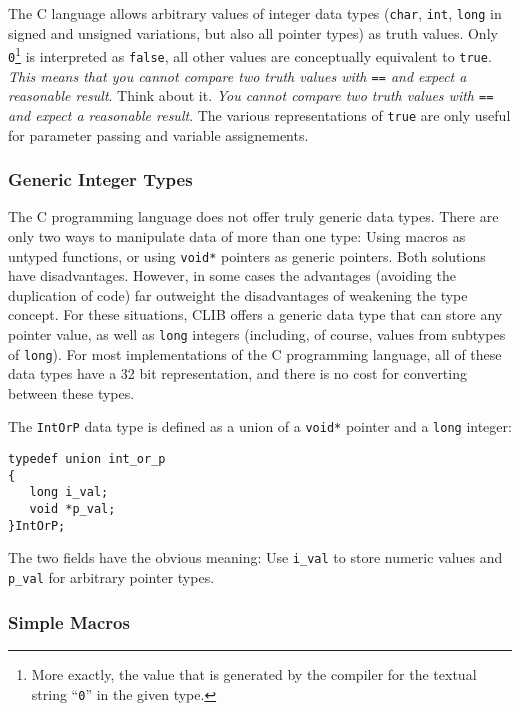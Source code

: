 The C language allows arbitrary values of integer data types
(\texttt{char}, \texttt{int}, \texttt{long} in signed and unsigned
variations, but also all pointer types) as truth values. Only
\texttt{0}\footnote{More exactly, the value that is generated by the
  compiler for the textual string ``\texttt{0}'' in the given type.}
is interpreted as \texttt{false}, all other values are conceptually
equivalent to \texttt{true}. \emph{This means that you cannot compare
  two truth values with \texttt{==} and expect a reasonable result}.
Think about it. \emph{You cannot compare two truth values with
  \texttt{==} and expect a reasonable result}. The various
representations of \texttt{true} are only useful for parameter passing
and variable assignements.


\subsubsection{Generic Integer Types}

The C programming language does not offer truly generic data types.
There are only two ways to manipulate data of more than one type:
Using macros as untyped functions, or using \texttt{void*} pointers as
generic pointers. Both solutions have disadvantages. However, in some
cases the advantages (avoiding the duplication of code) far outweight
the disadvantages of weakening the type concept. For these situations,
CLIB offers a generic data type that can store any pointer value, as
well as \texttt{long} integers (including, of course, values from
subtypes of \texttt{long}). For most implementations of the C
programming language, all of these data types have a 32 bit
representation, and there is no cost for converting between these
types.

The \texttt{IntOrP} data type is defined as a union of a
\texttt{void*} pointer and a \texttt{long} integer:

\begin{verbatim}
typedef union int_or_p
{
   long i_val;
   void *p_val;
}IntOrP;
\end{verbatim}

The two fields have the obvious meaning: Use \texttt{i\_val} to store
numeric values and \texttt{p\_val} for arbitrary pointer types.



\subsubsection{Simple Macros}

